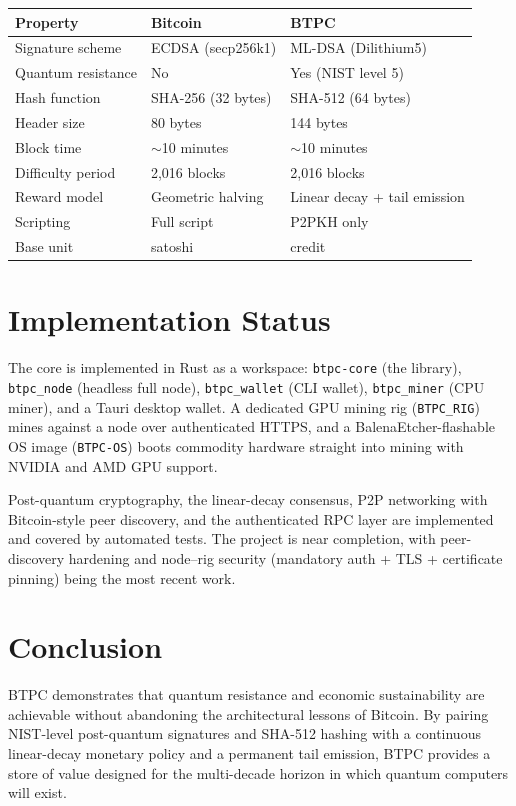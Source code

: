 \documentclass[11pt,a4paper]{article}
\begin{document}
\begin{center}
\begin{tabular}{lll}
\toprule
\textbf{Property} & \textbf{Bitcoin} & \textbf{BTPC} \\
\midrule
Signature scheme & ECDSA (secp256k1) & ML-DSA (Dilithium5) \\
Quantum resistance & No & Yes (NIST level 5) \\
Hash function & SHA-256 (32 bytes) & SHA-512 (64 bytes) \\
Header size & 80 bytes & 144 bytes \\
Block time & $\sim$10 minutes & $\sim$10 minutes \\
Difficulty period & 2{,}016 blocks & 2{,}016 blocks \\
Reward model & Geometric halving & Linear decay + tail emission \\
Scripting & Full script & P2PKH only \\
Base unit & satoshi & credit \\
\bottomrule
\end{tabular}
\end{center}

\section{Implementation Status}

The core is implemented in Rust as a workspace: \texttt{btpc-core} (the library), \texttt{btpc\_node} (headless full node), \texttt{btpc\_wallet} (CLI wallet), \texttt{btpc\_miner} (CPU miner), and a Tauri desktop wallet. A dedicated GPU mining rig (\texttt{BTPC\_RIG}) mines against a node over authenticated HTTPS, and a BalenaEtcher-flashable OS image (\texttt{BTPC-OS}) boots commodity hardware straight into mining with NVIDIA and AMD GPU support.

Post-quantum cryptography, the linear-decay consensus, P2P networking with Bitcoin-style peer discovery, and the authenticated RPC layer are implemented and covered by automated tests. The project is near completion, with peer-discovery hardening and node--rig security (mandatory auth + TLS + certificate pinning) being the most recent work.

\section{Conclusion}

BTPC demonstrates that quantum resistance and economic sustainability are achievable without abandoning the architectural lessons of Bitcoin. By pairing NIST-level post-quantum signatures and SHA-512 hashing with a continuous linear-decay monetary policy and a permanent tail emission, BTPC provides a store of value designed for the multi-decade horizon in which quantum computers will exist.
\end{document}
